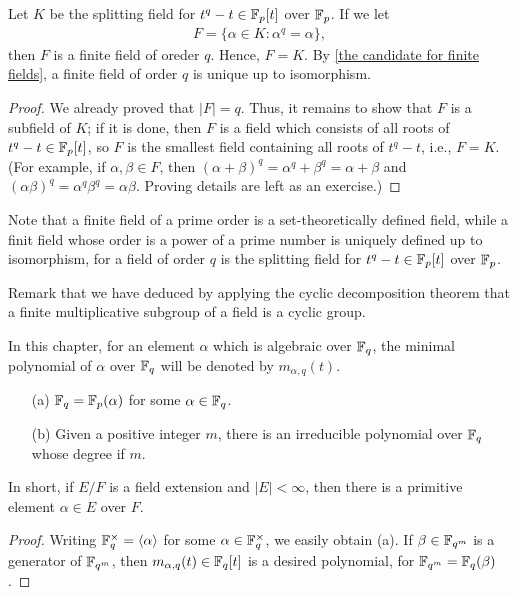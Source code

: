 \begin{thm}
    Let $K$ be the splitting field for $t^q-t\in{\mathbb{F}}_p[t]$ over ${\mathbb{F}}_p$.
    If we let
    \begin{align*}
        F=\{\alpha\in K: \alpha^q=\alpha\},
    \end{align*}
    then $F$ is a finite field of oreder $q$.
    Hence, $F=K$.
    By \cref{the candidate for finite fields}, a finite field of order $q$ is unique up to isomorphism.
\end{thm}
\begin{proof}
    We already proved that $|F|=q$.
    Thus, it remains to show that $F$ is a subfield of $K$; if it is done, then $F$ is a field which consists of all roots of $t^q-t\in{\mathbb{F}}_p[t]$, so $F$ is the smallest field containing all roots of $t^q-t$, i.e., $F=K$.
    (For example, if $\alpha, \beta\in F$, then $(\alpha+\beta)^q=\alpha^q+\beta^q=\alpha+\beta$ and $(\alpha\beta)^q=\alpha^q\beta^q=\alpha\beta$.
    \color{brown}Proving details are left as an exercise.\color{black})
\end{proof}
\begin{rmk}
    Note that a finite field of a prime order is a set-theoretically defined field, while a finit field whose order is a power of a prime number is uniquely defined up to isomorphism, for a field of order $q$ is the splitting field for $t^q-t\in{\mathbb{F}}_p[t]$ over ${\mathbb{F}}_p$.
\end{rmk}

Remark that we have deduced by applying the cyclic decomposition theorem that a finite multiplicative subgroup of a field is a cyclic group.
\begin{nota}
    In this chapter, for an element $\alpha$ which is algebraic over ${\mathbb{F}}_q$, the minimal polynomial of $\alpha$ over ${\mathbb{F}}_q$ will be denoted by $m_{\alpha, q}(t)$.
\end{nota}

\begin{prop}
    \begin{enumerate}
        \item[(a)]
        {
            ${\mathbb{F}}_q={\mathbb{F}}_p(\alpha)$ for some $\alpha\in{\mathbb{F}}_q$.
        }
        \item[(b)]
        {
            Given a positive integer $m$, there is an irreducible polynomial over ${\mathbb{F}}_q$ whose degree if $m$.
        }
    \end{enumerate}
    In short, if $E/F$ is a field extension and $|E|<\infty$, then there is a primitive element $\alpha\in E$ over $F$.
\end{prop}
\begin{proof}
    Writing ${\mathbb{F}}_q^\times={\left\langle{\alpha}\right\rangle}$ for some $\alpha\in{\mathbb{F}}_q^\times$, we easily obtain (a).
    If $\beta\in{\mathbb{F}}_{q^m}$ is a generator of ${\mathbb{F}}_{q^m}$, then $m_{\alpha, q}(t)\in{\mathbb{F}}_q[t]$ is a desired polynomial, for ${\mathbb{F}}_{q^m}={\mathbb{F}}_q(\beta)$.
\end{proof}

